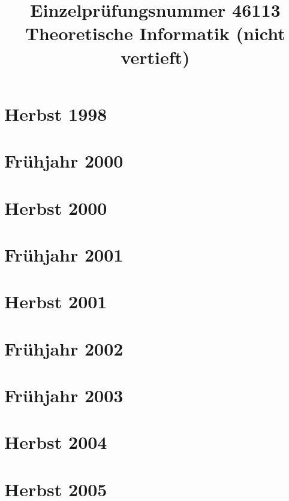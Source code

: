\documentclass{lehramt-informatik-examen-sammlung}
\title{Einzelprüfungsnummer 46113\\Theoretische Informatik (nicht vertieft)}
\begin{document}
\maketitle
\tableofcontents

\section{Herbst 1998}


\section{Frühjahr 2000}


\section{Herbst 2000}


\section{Frühjahr 2001}


\section{Herbst 2001}


\section{Frühjahr 2002}


\section{Frühjahr 2003}


\section{Herbst 2004}


\section{Herbst 2005}

\end{document}
